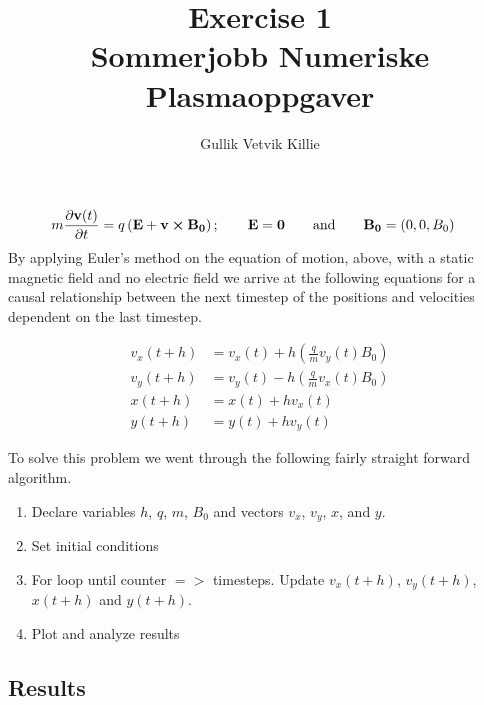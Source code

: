\documentclass[x11names]{article}
\title{ Exercise 1 \\ Sommerjobb Numeriske Plasmaoppgaver }
\author{Gullik Vetvik Killie
		}
\begin{document}
\maketitle


\section{}

\subsection{}
      \begin{align}
            m\pdv{\vb{v}(t)}{t} &= q \left( \vb{E} +   \vb{v}\cross \vb{B_0} \right); \qquad{} \vb{E} = \vb{0} \qquad{} \text{and} \qquad{} \vb{B_0} = (0,0,B_0)
      \end{align}
      By applying Euler's method on the equation of motion, above, with a static magnetic field  and no electric field we arrive at the following equations for a causal relationship between the next timestep of the positions and velocities dependent on the last timestep.

      \begin{align}
            v_x(t+ h) &= v_x(t) + h \left( \frac{q}{m} v_y(t) B_0 \right)
            \\
            v_y(t+ h) &= v_y(t) - h \left( \frac{q}{m} v_x(t) B_0 \right)
            \\
            x(t + h) &= x(t) + hv_x(t)
            \\
            y(t + h) &= y(t) + hv_y(t)
      \end{align}

      To solve this problem we went through the following fairly straight forward algorithm.

      \begin{enumerate}
            \item Declare variables $h$, $q$, $m$, \(B_0\) and vectors \(v_x\), $v_y$, $x$, and $y$.
            \item Set initial conditions
            \item For loop until counter \(=>\) timesteps. Update \(v_x(t+ h)\), $v_y(t+ h)$, $x(t + h)$ and $y(t + h)$.
            \item Plot and analyze results
      \end{enumerate}


\subsection{Results}
\end{document}
